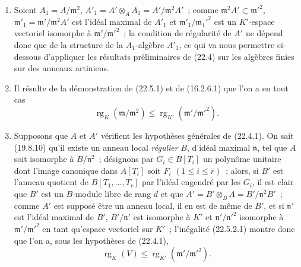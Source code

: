 \begin{remark}[22.5.2]
\label{0.22.5.2-fr}
\begin{enumerate}
  \item[\rm(i)] Soient $A_1=A/\mathfrak m^2$,
  $A'_1=A'\otimes_AA_1=A'/\mathfrak m^2A'$~; comme
  $\mathfrak m^2A'\subset\mathfrak m'^2$,
  $\mathfrak m'_1=\mathfrak m'/\mathfrak m^2A'$ est l'idéal maximal de $A'_1$
  et $\mathfrak m'_1/\mathfrak m_1'^2$ est un $K'$-espace vectoriel isomorphe
  à $\mathfrak m'/\mathfrak m'^2$~; la condition de régularité de $A'$ ne
  dépend donc que de la structure de la $A_1$-algèbre $A'_1$, ce qui va nous
  permettre ci-dessous d'appliquer les résultats préliminaires de (22.4) sur
  les algèbres finies sur des anneaux artiniens.
  \item[\rm(ii)] Il résulte de la démonstration de (22.5.1) et de (16.2.6.1)
  que l'on a en tout cas
  \begin{equation}
  \label{0.22.5.2.1-fr}
    \operatorname{rg}_K(\mathfrak m/\mathfrak m^2)
    \leqslant\operatorname{rg}_{K'}(\mathfrak m'/\mathfrak m'^2).
    \tag{22.5.2.1}
  \end{equation}


  \item[\rm(iii)] Supposons que $A$ et $A'$ vérifient les hypothèses générales
  de (22.4.1). On sait (19.8.10) qu'il existe un anneau local \emph{régulier}
  $B$, d'idéal maximal $\mathfrak n$, tel que $A$ soit isomorphe à
  $B/\mathfrak n^2$~; désignons par $G_i\in B[T_i]$ un polynôme unitaire dont
  l'image canonique dans $A[T_i]$ soit $F_i$ $(1\leqslant i\leqslant r)$~;
  alors, si $B'$ est l'anneau quotient de $B[T_1,\ldots,T_r]$ par l'idéal
  engendré par les $G_i$, il est clair que $B'$ est un $B$-module libre de rang
  $d$ et que $A'=B'\otimes_BA=B'/\mathfrak n^2B'$~; comme $A'$ est supposé être
  un anneau local, il en est de même de $B'$, et si $\mathfrak n'$ est l'idéal
  maximal de $B'$, $B'/\mathfrak n'$ est isomorphe à $K'$ et
  $\mathfrak n'/\mathfrak n'^2$ isomorphe à $\mathfrak m'/\mathfrak m'^2$ en
  tant qu'espace vectoriel sur $K'$~; l'inégalité (22.5.2.1) montre donc que
  l'on a, sous les hypothèses de (22.4.1),
  \begin{equation}
  \label{0.22.5.2.2-fr}
    \operatorname{rg}_K(V)\leqslant\operatorname{rg}_{K'}(\mathfrak m'/\mathfrak m'^2).
    \tag{22.5.2.2}
  \end{equation}
\end{enumerate}
\end{remark}

